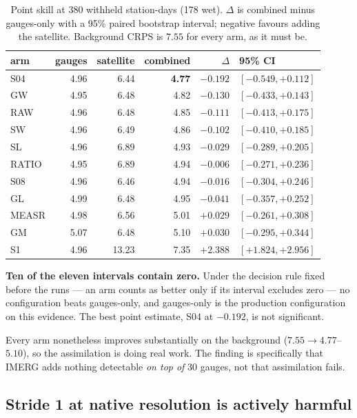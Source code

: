 \begin{table}[t]
\centering
\caption{Point skill at 380 withheld station-days (178 wet). $\Delta$ is
combined minus gauges-only with a 95\% paired bootstrap interval; negative
favours adding the satellite. Background CRPS is $7.55$ for every arm, as it
must be.}
\label{tab:ingestion-point}
\small
\begin{tabular}{lrrrr@{\hspace{4pt}}l}
\hline
arm & gauges & satellite & combined & $\Delta$ & 95\% CI \\
\hline
S04   & 4.96 &  6.44 & \textbf{4.77} & $-0.192$ & $[-0.549, +0.112]$ \\
GW    & 4.95 &  6.48 & 4.82 & $-0.130$ & $[-0.433, +0.143]$ \\
RAW   & 4.96 &  6.48 & 4.85 & $-0.111$ & $[-0.413, +0.175]$ \\
SW    & 4.96 &  6.49 & 4.86 & $-0.102$ & $[-0.410, +0.185]$ \\
SL    & 4.96 &  6.89 & 4.93 & $-0.029$ & $[-0.289, +0.205]$ \\
RATIO & 4.95 &  6.89 & 4.94 & $-0.006$ & $[-0.271, +0.236]$ \\
S08   & 4.96 &  6.46 & 4.94 & $-0.016$ & $[-0.304, +0.246]$ \\
GL    & 4.99 &  6.48 & 4.95 & $-0.041$ & $[-0.357, +0.252]$ \\
MEASR & 4.98 &  6.56 & 5.01 & $+0.029$ & $[-0.261, +0.308]$ \\
GM    & 5.07 &  6.48 & 5.10 & $+0.030$ & $[-0.295, +0.344]$ \\
S1    & 4.96 & 13.23 & 7.35 & $+2.388$ & $[+1.824, +2.956]$ \\
\hline
\end{tabular}
\end{table}

\textbf{Ten of the eleven intervals contain zero.} Under the decision rule
fixed before the runs --- an arm counts as better only if its interval excludes
zero --- no configuration beats gauges-only, and gauges-only is the production
configuration on this evidence. The best point estimate, S04 at $-0.192$, is
not significant.

Every arm nonetheless improves substantially on the background ($7.55
\rightarrow 4.77$--$5.10$), so the assimilation is doing real work. The finding
is specifically that IMERG adds nothing detectable \emph{on top of} 30 gauges,
not that assimilation fails.

\subsection{Stride 1 at native resolution is actively harmful}

